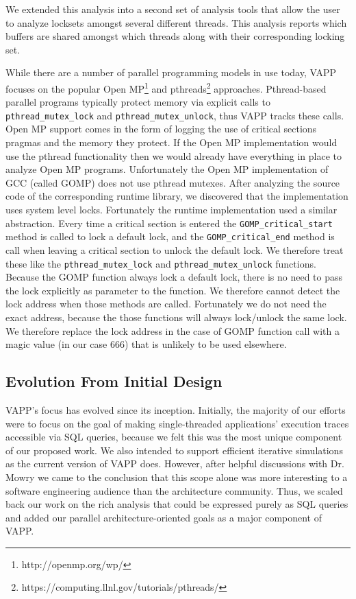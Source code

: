 We extended this analysis into a second set of analysis tools that allow the
user to analyze locksets amongst several different threads. This analysis
reports which buffers are shared amongst which threads along with
their corresponding locking set.

While there are a number of parallel programming models in use today,
VAPP focuses on the popular Open MP\footnote{http://openmp.org/wp/} and
pthreads\footnote{https://computing.llnl.gov/tutorials/pthreads/}
approaches.  Pthread-based parallel programs typically protect memory
via explicit calls to \texttt{pthread\_mutex\_lock} and
\texttt{pthread\_mutex\_unlock}, thus VAPP tracks these calls.  Open MP
support comes in the form of logging the use of critical sections
pragmas and the memory they protect. If the Open MP implementation
would use the pthread functionality then we would already have
everything in place to analyze Open MP programs. Unfortunately
the Open MP implementation of GCC (called GOMP) does not use pthread
mutexes. After analyzing the source code of the corresponding runtime
library, we discovered that the implementation uses system level
locks. Fortunately the runtime implementation used a similar
abstraction. Every time a critical section is entered the
\texttt{GOMP\_critical\_start} method is called to lock a default
lock, and the \texttt{GOMP\_critical\_end} method is call when leaving
a critical section to unlock the default lock. We therefore treat these
like the \texttt{pthread\_mutex\_lock} and
\texttt{pthread\_mutex\_unlock} functions. Because the GOMP function
always lock a default lock, there is no need to pass the lock explicitly
as parameter to the function. We therefore cannot detect the lock
address when those methods are called. Fortunately we do not need the
exact address, because the those functions will always lock/unlock the
same lock. We therefore replace the lock address in the case of GOMP
function call with a magic value (in our case 666) that is unlikely
to be used elsewhere.

\subsection{Evolution From Initial Design}
VAPP's focus has evolved since its inception.  Initially, the
majority of our efforts were to focus on the goal of making
single-threaded applications' execution traces accessible via SQL
queries, because we felt this was the most unique component of our
proposed work.  We also intended to support efficient iterative
simulations as the current version of VAPP does.  However, after
helpful discussions with Dr. Mowry we came to the conclusion that this
scope alone was more interesting to a software engineering audience
than the architecture community.  Thus, we scaled back our work on the
rich analysis that could be expressed purely as SQL queries and added
our parallel architecture-oriented goals as a major component of VAPP.

